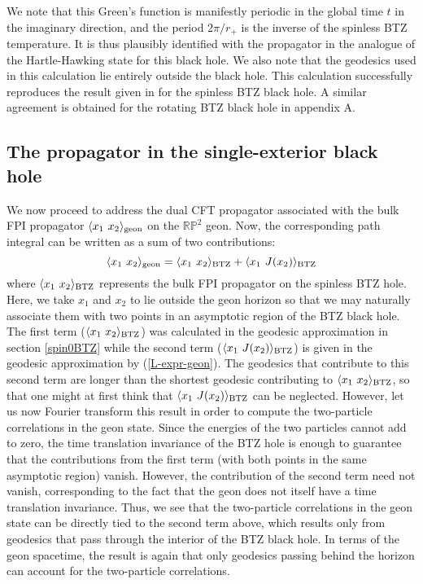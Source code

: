 \documentclass[a4paper,12pt]{article}
\begin{document}
We note that this Green's function is manifestly periodic in the
global time $t$ in the imaginary direction, and the period $2\pi/r_+$
is the inverse of the spinless BTZ temperature.  It is thus plausibly
identified with the propagator in the analogue of the Hartle-Hawking
state for this black hole. We also note that the geodesics used in
this calculation lie entirely outside the black hole. This calculation
successfully reproduces the result given in \cite{esko1} for the
spinless BTZ black hole. A similar agreement is obtained for the
rotating BTZ black hole in appendix A.

\subsection{The propagator in the single-exterior black hole}
\label{subsec:propag-in-geon}

We now proceed to address the dual CFT propagator associated with the
bulk FPI propagator $\langle x_1 \ x_2 \rangle_{\rm geon}$ on the
${\mathbb R} {\mathbb P}^2$ geon.  Now, the corresponding path
integral can be written as a sum of two contributions:
\begin{equation}
\langle x_1 \ x_2 \rangle_{\rm geon} = \langle x_1 \ x_2 \rangle_{\rm
BTZ}
+ \langle x_1 \ J(x_2) \rangle_{\rm BTZ}
\end{equation}
where $\langle x_1 \ x_2 \rangle_{\rm BTZ}$ represents the bulk FPI
propagator on the spinless BTZ hole.  Here, we take $x_1$ and $x_2$ to
lie outside the geon horizon so that we may naturally associate them
with two points in an asymptotic region of the BTZ black hole.  The
first term ($\langle x_1 \ x_2 \rangle_{\rm BTZ}$) was calculated in
the geodesic approximation in section \ref{spin0BTZ} while the second
term ($\langle x_1 \ J(x_2) \rangle_{\rm BTZ}$) is given in the
geodesic approximation by (\ref{L-expr-geon}).  The geodesics that
contribute to this second term are longer than the shortest geodesic
contributing to $\langle x_1 \ x_2 \rangle_{\rm BTZ}$, so that one
might at first think that $\langle x_1 \ J(x_2) \rangle_{\rm BTZ}$ can
be neglected.  However, let us now Fourier transform this result in
order to compute the two-particle correlations in the geon state.
Since the energies of the two particles cannot add to zero, the time
translation invariance of the BTZ hole is enough to guarantee that the
contributions from the first term (with both points in the same
asymptotic region) vanish.  However, the contribution of the second
term need not vanish, corresponding to the fact that the geon does not
itself have a time translation invariance.  Thus, we see that the
two-particle correlations in the geon state can be directly tied to
the second term above, which results only from geodesics that pass through
the interior of the BTZ black hole.  In terms of the geon spacetime, 
the result is again that only geodesics passing behind the horizon
can account for the two-particle correlations.
\end{document}
